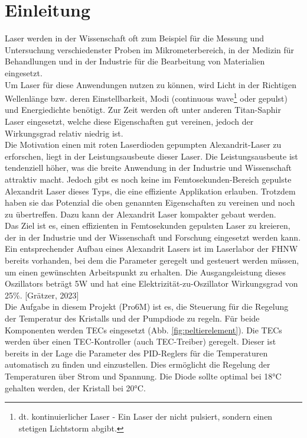 \section{Einleitung}
Laser werden in der Wissenschaft oft zum Beispiel für die Messung und Untersuchung verschiedenster Proben im Mikrometerbereich, in der Medizin für Behandlungen und in der Industrie für die Bearbeitung von Materialien eingesetzt.\\
Um Laser für diese Anwendungen nutzen zu können, wird Licht in der Richtigen Wellenlänge bzw. deren Einstellbarkeit, Modi (continuous wave\footnote{ dt. kontinuierlicher Laser - Ein Laser der nicht pulsiert, sondern einen stetigen Lichtstorm abgibt.} oder gepulst) und Energiedichte benötigt. Zur Zeit werden oft unter anderen Titan-Saphir Laser eingesetzt, welche diese Eigenschaften gut vereinen, jedoch der Wirkungsgrad relativ niedrig ist.\\
Die Motivation einen mit roten Laserdioden gepumpten Alexandrit-Laser zu erforschen, liegt in der Leistungsausbeute dieser Laser. Die Leistungsausbeute ist tendenziell höher, was die breite Anwendung in der Industrie und Wissenschaft attraktiv macht. Jedoch gibt es noch keine im Femtosekunden-Bereich gepulste Alexandrit Laser dieses Typs, die eine effiziente Applikation erlauben. Trotzdem haben sie das Potenzial die oben genannten Eigenschaften zu vereinen und noch zu übertreffen. Dazu kann der Alexandrit Laser kompakter gebaut werden.\\

Das Ziel ist es, einen effizienten in Femtosekunden gepulsten Laser zu kreieren, der in der Industrie und der Wissenschaft und Forschung eingesetzt werden kann.\\
Ein entsprechender Aufbau eines Alexandrit Lasers ist im Laserlabor der FHNW bereits vorhanden, bei dem die Parameter geregelt und gesteuert werden müssen, um einen gewünschten Arbeitspunkt zu erhalten. Die Ausgangsleistung dieses Oszillators beträgt 5W und hat eine Elektrizität-zu-Oszillator Wirkungsgrad von 25\%. [Grätzer, 2023]\\  %

Die Aufgabe in diesem Projekt (Pro6M) ist es,  die Steuerung für die Regelung der Temperatur des Kristalls und der Pumpdiode zu regeln. Für beide Komponenten werden TECs eingesetzt (Abb. \ref{fig:peltierelement}).  Die TECs werden über einen TEC-Kontroller (auch TEC-Treiber) geregelt. Dieser ist bereits in der Lage  die Parameter des PID-Reglers für die Temperaturen automatisch zu finden und einzustellen. Dies ermöglicht die Regelung der Temperaturen über Strom und Spannung. Die Diode sollte optimal bei 18°C gehalten werden, der Kristall bei 20°C.

